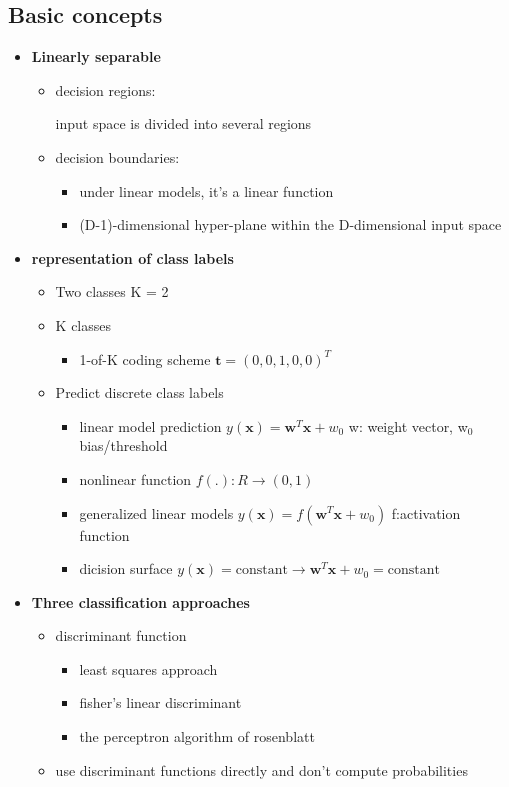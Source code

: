 \documentclass[11pt]{article}
\newcommand{\bl}[1] {\boldsymbol{#1}}
\begin{document}
\subsection{Basic concepts}
\label{sec:org92da548}
\begin{itemize}
\item \textbf{Linearly separable}
\begin{itemize}
\item decision regions:

input space is divided into several regions
\item decision boundaries:
\begin{itemize}
\item under linear models, it's a linear function
\item (D-1)-dimensional hyper-plane within the D-dimensional input space
\end{itemize}
\end{itemize}
\item \textbf{representation of class labels}
\begin{itemize}
\item Two classes K = 2
\item K classes
\begin{itemize}
\item 1-of-K coding scheme \(\bl{t}=(0,0,1,0,0)^T\)
\end{itemize}
\item Predict discrete class labels
\begin{itemize}
\item linear model prediction \(y(\bl{x})=\bl{w}^T\bl{x}+w_0\)
w: weight vector, w\(_{\text{0}}\) bias/threshold
\item nonlinear function \(f(.):R\to(0,1)\)
\item generalized linear models
\(y(\bl{x})=f(\bl{w}^T\bl{x}+w_0)\)
f:activation function
\item dicision surface
\(y(\bl{x})=\text{constant}\to \bl{w}^T\bl{x}+w_0=\text{constant}\)
\end{itemize}
\end{itemize}
\item \textbf{Three classification approaches}
\begin{itemize}
\item discriminant function
\begin{itemize}
\item least squares approach
\item fisher's linear discriminant
\item the perceptron algorithm of rosenblatt
\end{itemize}
\item use discriminant functions directly and don't compute probabilities


\end{itemize}
\end{itemize}
\end{document}
